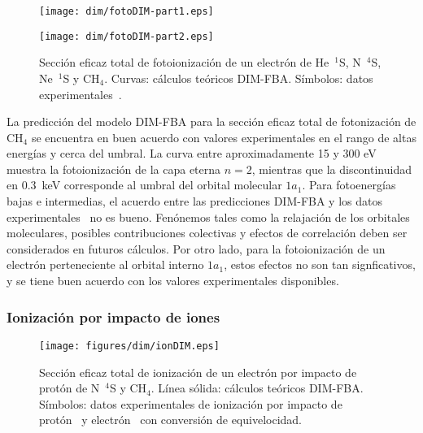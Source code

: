 {{{{\begin{figure}
\centering
\texttt{[image: dim/fotoDIM-part1.eps]} 

\vspace{-1.15cm}
\texttt{[image: dim/fotoDIM-part2.eps]}
\caption[Fotoionización de He, N, Ne y CH$_4$.]
{Sección eficaz total de fotoionización de un electrón de He~$^1$S, 
N~$^4$S, Ne~$^1$S y CH$_4$. Curvas: cálculos teóricos DIM-FBA. Símbolos: 
datos experimentales~\cite{Samson:90,Henke:93,Stolte:16,Samson:02,
Lukirskii:64,Henke:82,Samson:89}.}
\label{fig:photoDIM}
\end{figure}

La predicción del modelo DIM-FBA para la sección eficaz total de 
fotonización de CH$_4$ se encuentra en buen acuerdo con valores 
experimentales en el rango de altas energías y cerca del umbral. La 
curva entre aproximadamente 15 y 300 eV muestra la fotoionización de la 
capa eterna $n=2$, mientras que la discontinuidad en $0.3$~keV 
corresponde al umbral del orbital molecular $1a_1$. Para fotoenergías 
bajas e intermedias, el acuerdo entre las predicciones DIM-FBA y los 
datos experimentales~\cite{Lukirskii:64,Henke:82,Samson:89} no es bueno. 
Fenónemos tales como la relajación de los orbitales moleculares, 
posibles contribuciones colectivas y efectos de correlación deben ser  
considerados en futuros cálculos. Por otro lado, para la fotoionización 
de un electrón perteneciente al orbital interno $1a_1$, estos efectos no 
son tan signficativos, y se tiene buen acuerdo con los valores 
experimentales disponibles. 

\subsubsection{Ionización por impacto de iones}
\label{subsec:dimion}

\begin{figure}
\centering
\texttt{[image: figures/dim/ionDIM.eps]}
\caption[Ionización por impacto de protón de N y CH$_4$.]
{Sección eficaz total de ionización de un electrón por impacto de protón 
de N~$^4$S y CH$_4$. Línea sólida: cálculos teóricos DIM-FBA. 
Símbolos: datos experimentales de ionización por impacto de 
protón~\cite{Rudd:83,Rudd:85} y electrón~\cite{Brook:78} con conversión 
de equivelocidad.}
\label{fig:iondim}
\end{figure}

}}}}
